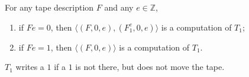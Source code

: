 For any tape description $F$ and any $e \in \mathbb{Z}$,
\begin{enumerate}
\item[(i)] if $Fe = 0$, then $\langle (F, 0, e), (F_1^e, 0, e) \rangle$ is a computation of $T_1$;
\item[(ii)] if $Fe = 1$, then $\langle (F, 0, e) \rangle$ is a computation of $T_1$.
\end{enumerate}
$T_1$ writes a $1$ if a $1$ is not there, but does not move the tape.

